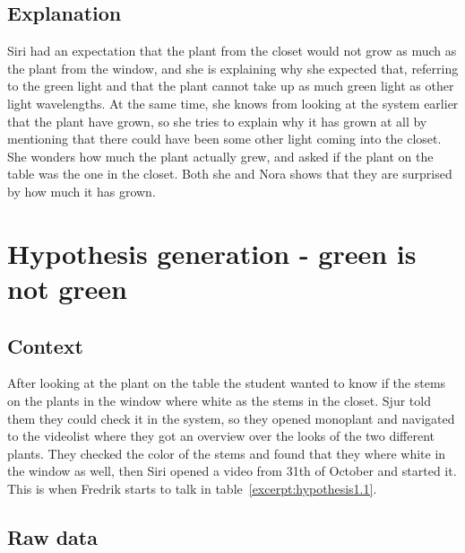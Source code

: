 \subsection{Explanation}
Siri had an expectation that the plant from the closet would not grow as much as the plant from the window, and she is explaining why she expected that, referring to the green light and that the plant cannot take up as much green light as other light wavelengths. At the same time, she knows from looking at the system earlier that the plant have grown, so she tries to explain why it has grown at all by mentioning that there could have been some other light coming into the closet. She wonders how much the plant actually grew, and asked if the plant on the table was the one in the closet. Both she and Nora shows that they are surprised by how much it has grown.


\section{Hypothesis generation - green is not green}

\subsection{Context}
After looking at the plant on the table the student wanted to know if the stems on the plants in the window where white as the stems in the closet. Sjur told them they could check it in the system, so they opened monoplant and navigated to the videolist where they got an overview over the looks of the two different plants. They checked the color of the stems and found that they where white in the window as well, then Siri opened a video from 31th of October and started it. This is when Fredrik starts to talk in table~\ref{excerpt:hypothesis1.1}.



\subsection{Raw data}



